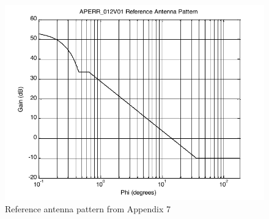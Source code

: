 \documentclass[11pt]{article}
\begin{document}
\begin{figure}
  \begin{center}
    \includegraphics{figure-reference-antenna-pattern-plot.pdf}
  \end{center}
  \caption{Reference antenna pattern from Appendix 7}\label{figure-reference-antenna-pattern-plot}
\end{figure}
\end{document}
